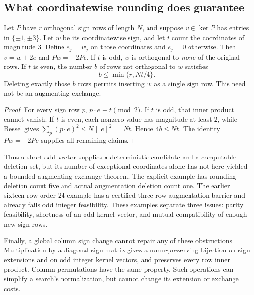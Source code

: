 \subsection{What coordinatewise rounding does guarantee}
\begin{proposition}
Let $P$ have $r$ orthogonal sign rows of length $N$, and suppose
$v\in\ker P$ has entries in $\{\pm1,\pm3\}$. Let $w$ be its
coordinatewise sign, and let $t$ count the coordinates of magnitude
$3$. Define $e_j=w_j$ on those coordinates and $e_j=0$ otherwise.
Then $v=w+2e$ and $Pw=-2Pe$.
If $t$ is odd, $w$ is orthogonal to \emph{none} of the original rows.
If $t$ is even, the number $b$ of rows not orthogonal to $w$ satisfies
\[
 b\le\min\{r,Nt/4\}.
\]
Deleting exactly those $b$ rows permits inserting $w$ as a single
sign row. This need not be an augmenting exchange.
\end{proposition}
\begin{proof}
For every sign row $p$, $p\cdot e\equiv t\pmod2$. If $t$ is odd,
that inner product cannot vanish. If $t$ is even, each nonzero value
has magnitude at least $2$, while Bessel gives
$\sum_p(p\cdot e)^2\le N\|e\|^2=Nt$. Hence $4b\le Nt$.
The identity $Pw=-2Pe$ supplies all remaining claims.
\end{proof}

Thus a short odd vector supplies a deterministic candidate and a
computable deletion set, but its number of exceptional coordinates
alone has not here yielded a bounded augmenting-exchange theorem.
The explicit example has rounding deletion count five and actual
augmentation deletion count one. The earlier sixteen-row order-$24$
example has a certified three-row augmentation barrier and already
fails odd integer feasibility. These examples separate three issues:
parity feasibility, shortness of an odd kernel vector, and mutual
compatibility of enough new sign rows.

Finally, a global column sign change cannot repair any of these
obstructions. Multiplication by a diagonal sign matrix gives a
norm-preserving bijection on sign extensions and on odd integer kernel
vectors, and preserves every row inner product. Column permutations
have the same property. Such operations can simplify a search's
normalization, but cannot change its extension or exchange costs.
